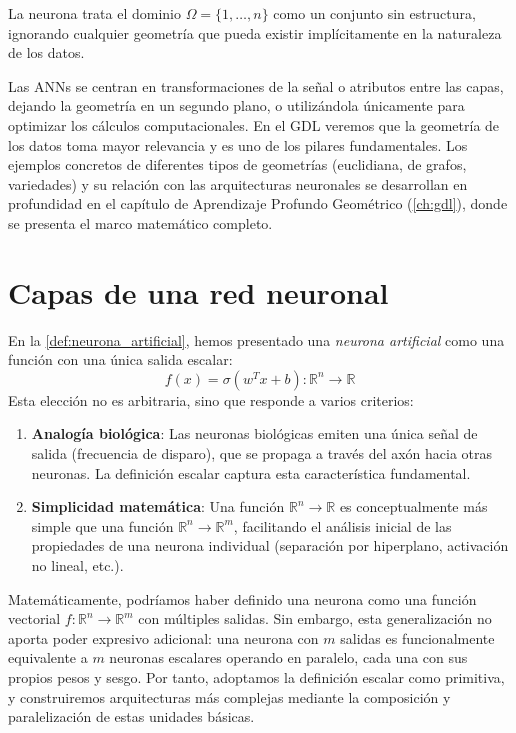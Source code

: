 La neurona trata el dominio $\Omega = \{1,\ldots,n\}$ como un conjunto sin estructura, ignorando cualquier geometría que pueda existir implícitamente en la naturaleza de los datos.

Las \glspl{ANN} se centran en transformaciones de la señal o atributos entre las capas, dejando la geometría en un segundo plano, o utilizándola únicamente para optimizar los cálculos computacionales. En el \gls{GDL} veremos que la geometría de los datos toma mayor relevancia y es uno de los pilares fundamentales. Los ejemplos concretos de diferentes tipos de geometrías (euclidiana, de grafos, variedades) y su relación con las arquitecturas neuronales se desarrollan en profundidad en el capítulo de Aprendizaje Profundo Geométrico (\autoref{ch:gdl}), donde se presenta el marco matemático completo.

\section{Capas de una red neuronal}

En la \autoref{def:neurona_artificial}, hemos presentado una \textit{neurona artificial} como una función con una única salida escalar:
\[
f(x) = \sigma(w^T x + b): \mathbb{R}^n \to \mathbb{R}
\]
Esta elección no es arbitraria, sino que responde a varios criterios:

\begin{enumerate}
    \item \textbf{Analogía biológica}: Las neuronas biológicas emiten una única señal de salida (frecuencia de disparo), que se propaga a través del axón hacia otras neuronas. La definición escalar captura esta característica fundamental.

    \item \textbf{Simplicidad matemática}: Una función $\mathbb{R}^n \to \mathbb{R}$ es conceptualmente más simple que una función $\mathbb{R}^n \to \mathbb{R}^m$, facilitando el análisis inicial de las propiedades de una neurona individual (separación por hiperplano, activación no lineal, etc.).
\end{enumerate}

Matemáticamente, podríamos haber definido una neurona como una función vectorial $f: \mathbb{R}^n \to \mathbb{R}^m$ con múltiples salidas. Sin embargo, esta generalización no aporta poder expresivo adicional: una neurona con $m$ salidas es funcionalmente equivalente a $m$ neuronas escalares operando en paralelo, cada una con sus propios pesos y sesgo. Por tanto, adoptamos la definición escalar como primitiva, y construiremos arquitecturas más complejas mediante la composición y paralelización de estas unidades básicas.

